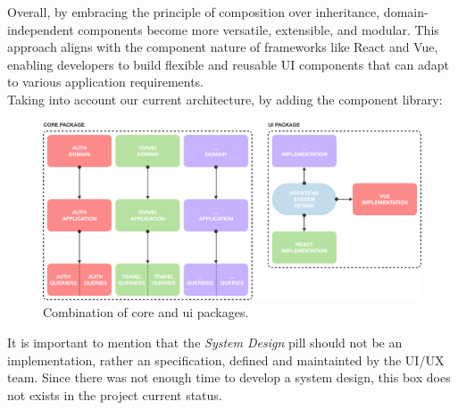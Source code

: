 \documentclass[../design.tex]{subfiles}
\begin{document}
Overall, by embracing the principle of composition over inheritance,
domain-independent components become more versatile, extensible, and modular.
This approach aligns with the component nature of frameworks like React
and Vue, enabling developers to build flexible and reusable UI components that
can adapt to various application requirements.
\\[8pt]
Taking into account our current architecture, by adding the component library:
\begin{figure}[H]
	\centering
	\includegraphics[width=\textwidth]{./assets/ui-core.png}
	\caption{Combination of core and ui packages.}
\end{figure}
It is important to mention that the \emph{System Design} pill should not be an
implementation, rather an specification, defined and maintainted by the UI/UX
team. Since there was not enough time to develop a system design, this box does
not exists in the project current status.
\end{document}
